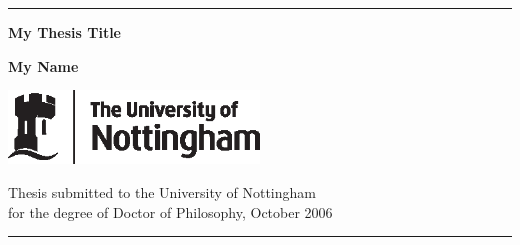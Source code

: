 %
%

\newcommand{\HRule}{\rule{\linewidth}{2mm}}
\begin{titlepage}

\begin{center}

\HRule


\LARGE{\textbf{My Thesis Title}}


\large{\textbf{My Name}}



\includegraphics[width=0.5\textwidth]{un_tf_blk.eps}


	Thesis submitted to the University of Nottingham\\
	for the degree of Doctor of Philosophy, October 2006\\


\HRule
\end{center}

\end{titlepage}


